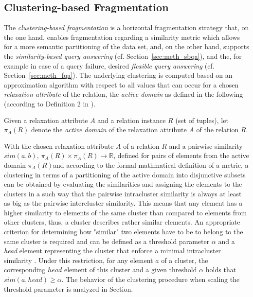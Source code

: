  
 
\subsection{Clustering-based Fragmentation}
\label{sec:meth_cbfr}

The \emph{clustering-based fragmentation} \citep{Wiese2014} is a horizontal fragmentation strategy that, on the one hand, enables fragmentation regarding 
a similarity metric which allows for a more semantic partitioning of the data set, and, on the other hand, supports the \emph{similarity-based query
answering} (cf. Section~\ref{sec:meth_sbqa}), and the, for example in case of a query failure, desired \emph{flexible query answering} 
(cf. Section~\ref{sec:meth_fqa}). The underlying clustering is computed based on an approximation algorithm \citep{Gonzales1985} with respect to all 
values that can occur for a chosen \emph{relaxation attribute} of the relation, the \emph{active domain} as defined in the following (according to
Definition 2 in \cite{Wiese2014}).

\begin{definition}
Given a relaxation attribute $A$ and a relation instance $R$ (set of tuples), let $\pi_A(R)$ denote the \emph{active domain} of the relaxation attribute
$A$ of the relation $R$.
\end{definition}

With the chosen relaxation attribute $A$ of a relation $R$ and a pairwise similarity $sim(a, b)$, $\pi_A(R) \times \pi_A(R) \to \mathbb{R}$, defined  
for pairs of elements from the active domain $\pi_A(R)$and according to the formal mathmatical definition of a metric, a clustering in terms of a 
partitioning of the active domain into disjunctive subsets can be obtained by evaluating the similarities and assigning the elements to the clusters in
a such way that the pairwise intracluster similarity is always at least as big as the pairwise intercluster similarity. This means that any element has 
a higher similarity to elements of the same cluster than compared to elements from other clusters, thus, a cluster describes rather similar elements. 
An appropriate criterion for determining how "similar" two elements have to be to belong to the same cluster is required and can be defined as a threshold
parameter $\alpha$ and a \emph{head} element representing the cluster that enforce a minimal intracluster similarity \cite{Gonzales1985}. Under this
restriction, for any element $a$ of a cluster, the corresponding $head$ element of this cluster and a given threshold $\alpha$ holds that 
$sim(a,head) \geq \alpha$. The behavior of the clustering procedure when scaling the threshold parameter is analyzed in Section. 

